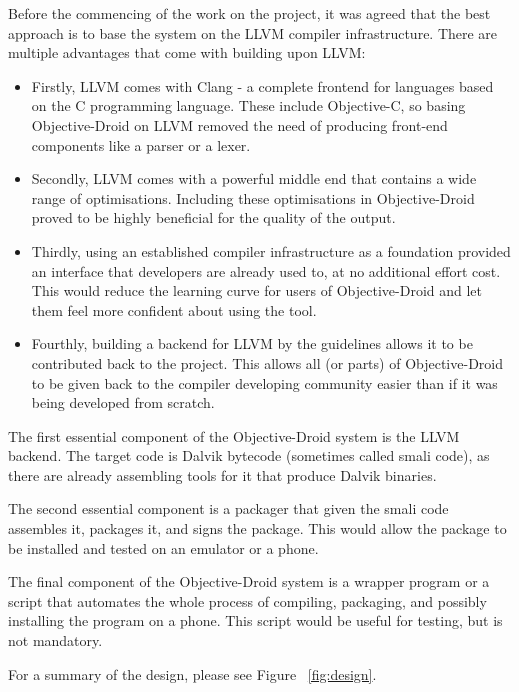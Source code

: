 \documentclass[parskip]{cs4rep}
\begin{document}
Before the commencing of the work on the project, it was agreed that the best approach is to base the system on the LLVM compiler infrastructure. There are multiple advantages that come with building upon LLVM:
\begin{itemize}
\item
Firstly, LLVM comes with Clang - a complete frontend for languages based on the C programming language. These include Objective-C, so basing Objective-Droid on LLVM removed the need of producing front-end components like a parser or a lexer.
\item
Secondly, LLVM comes with a powerful middle end that contains a wide range of optimisations\cite{P7}. Including these optimisations in Objective-Droid proved to be highly beneficial for the quality of the output. 
\item
Thirdly, using an established compiler infrastructure as a foundation provided an interface that developers are already used to, at no additional effort cost. This would reduce the learning curve for users of Objective-Droid and let them feel more confident about using the tool.
\item
Fourthly, building a backend for LLVM by the guidelines allows it to be contributed back to the project. This allows all (or parts) of Objective-Droid to be given back to the compiler developing community easier than if it was being developed from scratch.
\end{itemize}

The first essential component of the Objective-Droid system is the LLVM backend. The target code is Dalvik bytecode (sometimes called smali code), as there are already assembling tools for it that produce Dalvik binaries.

The second essential component is a packager that given the smali code assembles it, packages it, and signs the package. This would allow the package to be installed and tested on an emulator or a phone.

The final component of the Objective-Droid system is a wrapper program or a script that automates the whole process of compiling, packaging, and possibly installing the program on a phone. This script would be useful for testing, but is not mandatory.

For a summary of the design, please see Figure ~\ref{fig:design}.
\end{document}
